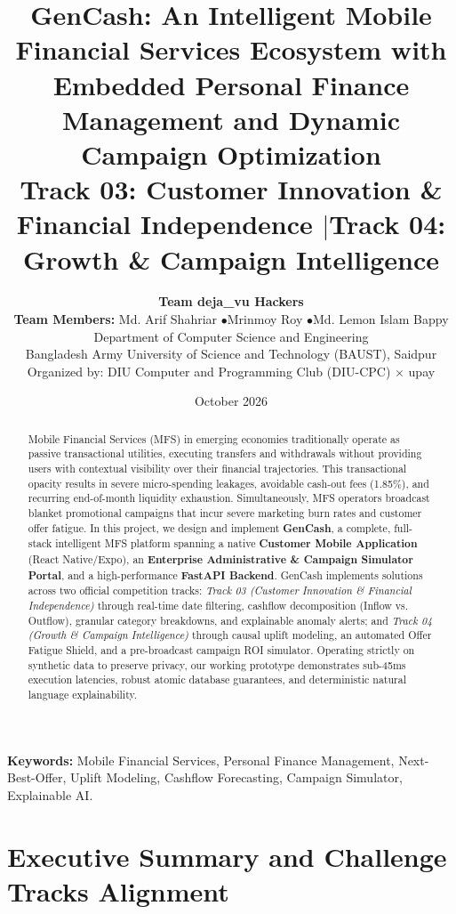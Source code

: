 \documentclass[10.5pt,a4paper]{article}
\title{\textbf{\LARGE GenCash: An Intelligent Mobile Financial Services Ecosystem with Embedded Personal Finance Management and Dynamic Campaign Optimization}\\[0.5em]
\large Track 03: Customer Innovation \& Financial Independence \quad$|$\quad Track 04: Growth \& Campaign Intelligence}
\author{
    \textbf{\large Team deja\_vu Hackers}\\[0.3em]
    \textbf{Team Members:} Md. Arif Shahriar \quad$\bullet$\quad Mrinmoy Roy \quad$\bullet$\quad Md. Lemon Islam Bappy\\[0.4em]
    Department of Computer Science and Engineering\\
    Bangladesh Army University of Science and Technology (BAUST), Saidpur\\[0.2em]
    \small Organized by: DIU Computer and Programming Club (DIU-CPC) $\times$ upay
}
\date{October 2026}
\begin{document}
\maketitle

\begin{abstract}
Mobile Financial Services (MFS) in emerging economies traditionally operate as passive transactional utilities, executing transfers and withdrawals without providing users with contextual visibility over their financial trajectories. This transactional opacity results in severe micro-spending leakages, avoidable cash-out fees (1.85\%), and recurring end-of-month liquidity exhaustion. Simultaneously, MFS operators broadcast blanket promotional campaigns that incur severe marketing burn rates and customer offer fatigue. In this project, we design and implement \textbf{GenCash}, a complete, full-stack intelligent MFS platform spanning a native \textbf{Customer Mobile Application} (React Native/Expo), an \textbf{Enterprise Administrative \& Campaign Simulator Portal}, and a high-performance \textbf{FastAPI Backend}. GenCash implements solutions across two official competition tracks: \textit{Track 03 (Customer Innovation \& Financial Independence)} through real-time date filtering, cashflow decomposition (Inflow vs. Outflow), granular category breakdowns, and explainable anomaly alerts; and \textit{Track 04 (Growth \& Campaign Intelligence)} through causal uplift modeling, an automated Offer Fatigue Shield, and a pre-broadcast campaign ROI simulator. Operating strictly on synthetic data to preserve privacy, our working prototype demonstrates sub-45ms execution latencies, robust atomic database guarantees, and deterministic natural language explainability.
\end{abstract}

\vspace{0.5em}
\noindent\textbf{Keywords:} Mobile Financial Services, Personal Finance Management, Next-Best-Offer, Uplift Modeling, Cashflow Forecasting, Campaign Simulator, Explainable AI.

\section{Executive Summary and Challenge Tracks Alignment}
\end{document}
